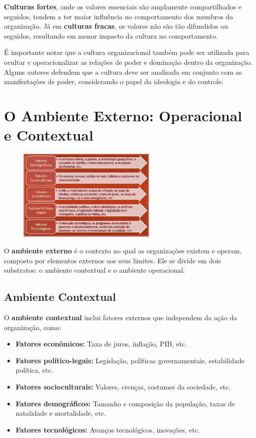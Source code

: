 \textbf{Culturas fortes}, onde os valores essenciais são amplamente compartilhados e seguidos, tendem a ter maior influência no comportamento dos membros da organização. Já em \textbf{culturas fracas}, os valores não são tão difundidos ou seguidos, resultando em menor impacto da cultura no comportamento.

É importante notar que a cultura organizacional também pode ser utilizada para ocultar e operacionalizar as relações de poder e dominação dentro da organização. Alguns autores defendem que a cultura deve ser analisada em conjunto com as manifestações de poder, considerando o papel da ideologia e do controle.

\section{O Ambiente Externo: Operacional e Contextual}
\begin{figure}[!h]
    \centering
    \includegraphics[width=0.6\textwidth]{img/imagem3.png}
    \label{fig:exemplo}
\end{figure}
O \textbf{ambiente externo} é o contexto no qual as organizações existem e operam, composto por elementos externos aos seus limites. Ele se divide em dois substratos: o ambiente contextual e o ambiente operacional.

\subsection{Ambiente Contextual}

O \textbf{ambiente contextual} inclui fatores externos que independem da ação da organização, como:

\begin{itemize}
    \item \textbf{Fatores econômicos:} Taxa de juros, inflação, PIB, etc.
    \item \textbf{Fatores político-legais:} Legislação, políticas governamentais, estabilidade política, etc.
    \item \textbf{Fatores socioculturais:} Valores, crenças, costumes da sociedade, etc.
    \item \textbf{Fatores demográficos:} Tamanho e composição da população, taxas de natalidade e mortalidade, etc.
    \item \textbf{Fatores tecnológicos:} Avanços tecnológicos, inovações, etc.
\end{itemize}

